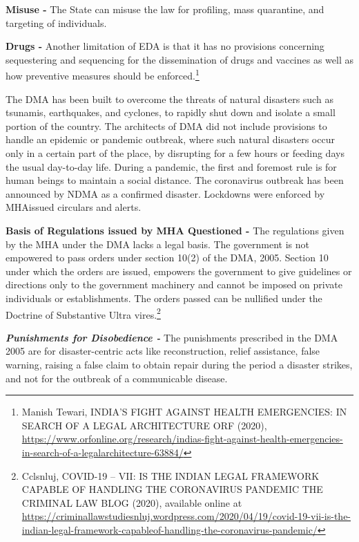 \begin{multicols}{2}
\noi
\textbf{Misuse -} The State can misuse the law for profiling, mass quarantine, and targeting of
individuals.

\noi
\textbf{Drugs -} Another limitation of EDA is that it has no provisions concerning sequestering and
sequencing for the dissemination of drugs and vaccines as well as how preventive measures
should be enforced.\footnote{Manish Tewari, INDIA'S FIGHT AGAINST HEALTH EMERGENCIES: IN SEARCH OF A LEGAL ARCHITECTURE ORF (2020), \url{https://www.orfonline.org/research/indias-fight-against-health-emergencies-in-search-of-a-legalarchitecture-63884/}}


\noi
The DMA has been built to overcome the threats of natural disasters such as tsunamis,
earthquakes, and cyclones, to rapidly shut down and isolate a small portion of the country.
The architects of DMA did not include provisions to handle an epidemic or pandemic
outbreak, where such natural disasters occur only in a certain part of the place, by disrupting
for a few hours or feeding days the usual day-to-day life. During a pandemic, the first and
foremost rule is for human beings to maintain a social distance. The coronavirus outbreak has been announced by NDMA as a confirmed disaster. Lockdowns were enforced by MHAissued circulars and alerts.

\noi
\textbf{Basis of Regulations issued by MHA Questioned -} The regulations given by the MHA
under the DMA lacks a legal basis. The government is not empowered to pass orders under
section 10(2) of the DMA, 2005. Section 10 under which the orders are issued, empowers the
government to give guidelines or directions only to the government machinery and cannot be
imposed on private individuals or establishments. The orders passed can be nullified under
the Doctrine of Substantive Ultra vires.\footnote{Cclsnluj, COVID-19 – VII: IS THE INDIAN LEGAL FRAMEWORK CAPABLE OF HANDLING THE CORONAVIRUS PANDEMIC THE CRIMINAL LAW BLOG (2020), available online at  \url{https://criminallawstudiesnluj.wordpress.com/2020/04/19/covid-19-vii-is-the-indian-legal-framework-capableof-handling-the-coronavirus-pandemic/}}

\noi
\textbf{\textit{Punishments for Disobedience -}} The punishments prescribed in the DMA 2005 are for
disaster-centric acts like reconstruction, relief assistance, false warning, raising a false claim
to obtain repair during the period a disaster strikes, and not for the outbreak of a
communicable disease.


\end{multicols}
